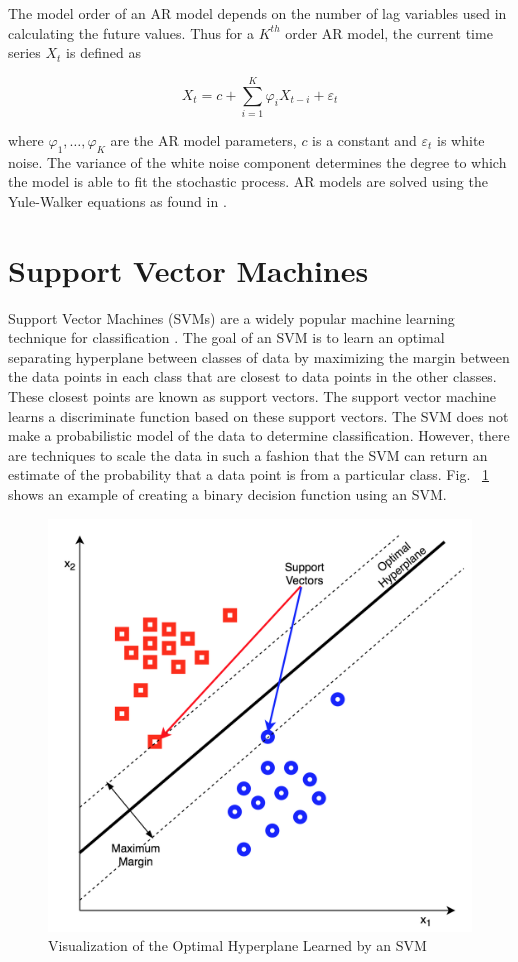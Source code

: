 The model order of an AR model depends on the number of lag variables used in calculating the future values. Thus for a $K^{th}$ order AR model, the current time series $X_t$ is defined as

\begin{equation}
X_{t} = c + \sum_{i = 1}^{K} \varphi_{i} X_{t-i} + \varepsilon_{t}
\end{equation}

where $\varphi_{1}, \dots, \varphi_{K}$ are the AR model parameters, $c$ is a constant and $\varepsilon_{t}$ is white noise. The variance of the white noise component determines the degree to which the model is able to fit the stochastic process. AR models are solved using the Yule-Walker equations as found in \cite{ARmodels}.

\section{Support Vector Machines}

Support Vector Machines (SVMs) are a widely popular machine learning technique for classification \cite{svm}. The goal of an SVM is to learn an optimal separating hyperplane between classes of data by maximizing the margin between the data points in each class that are closest to data points in the other classes. These closest points are known as support vectors. The support vector machine learns a discriminate function based on these support vectors. The SVM does not make a probabilistic model of the data to determine classification. However, there are techniques \cite{plattscaling} to scale the data in such a fashion that the SVM can return an estimate of the probability that a data point is from a particular class. Fig. ~\ref{svmvis} shows an example of creating a binary decision function  using an SVM.

\begin{figure}[htbp]
\centerline{\includegraphics[width=0.7\linewidth]{Background/svm_vis.png}}
\caption{Visualization of the Optimal Hyperplane Learned by an SVM }
\label{svmvis}
\end{figure}

